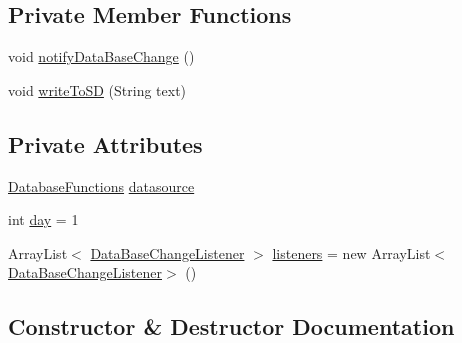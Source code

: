 \subsection*{Private Member Functions}
\begin{DoxyCompactItemize}
\item 
void \hyperlink{classcom_1_1social_1_1proximity_1_1_on_new_hour_update_a818ac6abd2ca17ec02dc3cc8f553c1f5}{notify\+Data\+Base\+Change} ()
\item 
void \hyperlink{classcom_1_1social_1_1proximity_1_1_on_new_hour_update_a7234323761f300d5b47728b0dc48d47f}{write\+To\+S\+D} (String text)
\end{DoxyCompactItemize}
\subsection*{Private Attributes}
\begin{DoxyCompactItemize}
\item 
\hyperlink{classcom_1_1social_1_1proximity_1_1_database_functions}{Database\+Functions} \hyperlink{classcom_1_1social_1_1proximity_1_1_on_new_hour_update_adf8f88328e9cf6ed2635fbd77ce1854f}{datasource}
\item 
int \hyperlink{classcom_1_1social_1_1proximity_1_1_on_new_hour_update_ab30d5827d79a03141a1c108da2b08e01}{day} = 1
\item 
Array\+List$<$ \hyperlink{interfacecom_1_1social_1_1proximity_1_1_data_base_change_listener}{Data\+Base\+Change\+Listener} $>$ \hyperlink{classcom_1_1social_1_1proximity_1_1_on_new_hour_update_afd3e5f40366b5d77fe49e17a00fb3cb1}{listeners} = new Array\+List$<$\hyperlink{interfacecom_1_1social_1_1proximity_1_1_data_base_change_listener}{Data\+Base\+Change\+Listener}$>$ ()
\end{DoxyCompactItemize}


\subsection{Constructor \& Destructor Documentation}
\hypertarget{classcom_1_1social_1_1proximity_1_1_on_new_hour_update_abd74ec78f0b1aa902641a2bbf868bbe7}{}
